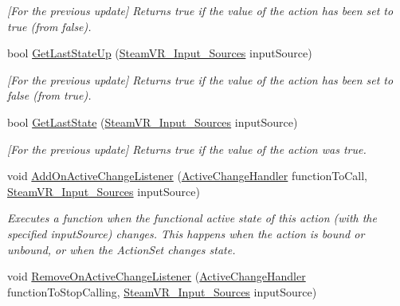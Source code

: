 \begin{DoxyCompactItemize}
\begin{DoxyCompactList}\small\item\em \mbox{[}For the previous update\mbox{]} Returns true if the value of the action has been set to true (from false). \end{DoxyCompactList}\item 
bool \mbox{\hyperlink{class_valve_1_1_v_r_1_1_steam_v_r___action___boolean_aaa7751d7c25465162535140bba43e5a2}{Get\+Last\+State\+Up}} (\mbox{\hyperlink{namespace_valve_1_1_v_r_a82e5bf501cc3aa155444ee3f0662853f}{Steam\+V\+R\+\_\+\+Input\+\_\+\+Sources}} input\+Source)
\begin{DoxyCompactList}\small\item\em \mbox{[}For the previous update\mbox{]} Returns true if the value of the action has been set to false (from true). \end{DoxyCompactList}\item 
bool \mbox{\hyperlink{class_valve_1_1_v_r_1_1_steam_v_r___action___boolean_aac1600cda39d44d405761e63cf268950}{Get\+Last\+State}} (\mbox{\hyperlink{namespace_valve_1_1_v_r_a82e5bf501cc3aa155444ee3f0662853f}{Steam\+V\+R\+\_\+\+Input\+\_\+\+Sources}} input\+Source)
\begin{DoxyCompactList}\small\item\em \mbox{[}For the previous update\mbox{]} Returns true if the value of the action was true. \end{DoxyCompactList}\item 
void \mbox{\hyperlink{class_valve_1_1_v_r_1_1_steam_v_r___action___boolean_aafd99e0f3abcda6a07f8f9b900afe15e}{Add\+On\+Active\+Change\+Listener}} (\mbox{\hyperlink{class_valve_1_1_v_r_1_1_steam_v_r___action___boolean_af9f3044d5e4868485945b70d907c6bbb}{Active\+Change\+Handler}} function\+To\+Call, \mbox{\hyperlink{namespace_valve_1_1_v_r_a82e5bf501cc3aa155444ee3f0662853f}{Steam\+V\+R\+\_\+\+Input\+\_\+\+Sources}} input\+Source)
\begin{DoxyCompactList}\small\item\em Executes a function when the {\itshape functional} active state of this action (with the specified input\+Source) changes. This happens when the action is bound or unbound, or when the Action\+Set changes state. \end{DoxyCompactList}\item 
void \mbox{\hyperlink{class_valve_1_1_v_r_1_1_steam_v_r___action___boolean_ab3b1adf6bf7cab23db177230d68ea943}{Remove\+On\+Active\+Change\+Listener}} (\mbox{\hyperlink{class_valve_1_1_v_r_1_1_steam_v_r___action___boolean_af9f3044d5e4868485945b70d907c6bbb}{Active\+Change\+Handler}} function\+To\+Stop\+Calling, \mbox{\hyperlink{namespace_valve_1_1_v_r_a82e5bf501cc3aa155444ee3f0662853f}{Steam\+V\+R\+\_\+\+Input\+\_\+\+Sources}} input\+Source)

\end{DoxyCompactItemize}
